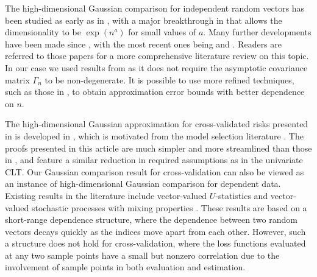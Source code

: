 \documentclass[11pt]{article}
\theoremstyle{plain}
\begin{document}
The high-dimensional Gaussian comparison for independent random vectors has been studied as early as in \cite{bentkus2003dependence}, with a major breakthrough in \cite{chernozhukov2013gaussian} that allows the dimensionality to be $\exp(n^a)$ for small values of $a$.  Many further developments have been made since \cite{chernozhukov2013gaussian}, with the most recent ones being \cite{chernozhukov2022improved} and \cite{chernozhukov2023nearly}. Readers are referred to those papers for a more comprehensive literature review on this topic.  In our case we used results from \cite{chernozhukov2022improved} as it does not require the asymptotic covariance matrix $\Gamma_n$ to be non-degenerate.
It is possible to use more refined techniques, such as those in \cite{chernozhukov2023nearly}, to obtain approximation error bounds with better dependence on $n$.

The high-dimensional Gaussian approximation for cross-validated risks presented in  is developed in \cite{kissel2022high}, which is motivated from the model selection literature \citep{lei2020cross}.  The proofs presented in this article are much simpler and more streamlined than those in \cite{kissel2022high}, and feature a similar reduction in required assumptions as in the univariate CLT.  Our Gaussian comparison result for cross-validation can also be viewed as an instance of high-dimensional Gaussian comparison for dependent data.  Existing results in the literature include vector-valued $U$-statistics \citep{chen2018gaussian} and vector-valued stochastic processes with mixing properties \citep{chang2021central,kurisu2021gaussian}.  These results are based on a short-range dependence structure, where the dependence between two random vectors decays quickly as the indices move apart from each other.  However, such a structure does not hold for cross-validation, where the loss functions evaluated at any two sample points have a small but nonzero correlation due to the involvement of sample points in both evaluation and estimation.
\newpage



\end{document}
